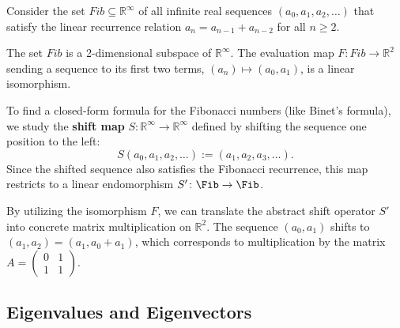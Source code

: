Consider the set $Fib \subseteq \mathbb{R}^\infty$ of all infinite real sequences $(a_0, a_1, a_2, \dots)$ that satisfy the linear recurrence relation $a_n = a_{n-1} + a_{n-2}$ for all $n \ge 2$.

\begin{proposition}
  The set $Fib$ is a 2-dimensional subspace of $\mathbb{R}^\infty$. The evaluation map $F \colon Fib \to \mathbb{R}^2$ sending a sequence to its first two terms, $(a_n) \mapsto (a_0, a_1)$, is a linear isomorphism.
\end{proposition}

To find a closed-form formula for the Fibonacci numbers (like Binet's formula), we study the \textbf{shift map} $S \colon \mathbb{R}^\infty \to \mathbb{R}^\infty$ defined by shifting the sequence one position to the left:
\[ S(a_0, a_1, a_2, \dots) := (a_1, a_2, a_3, \dots). \]
Since the shifted sequence also satisfies the Fibonacci recurrence, this map restricts to a linear endomorphism $S' \colon \Fib \to \Fib$.

By utilizing the isomorphism $F$, we can translate the abstract shift operator $S'$ into concrete matrix multiplication on $\mathbb{R}^2$. The sequence $(a_0, a_1)$ shifts to $(a_1, a_2) = (a_1, a_0 + a_1)$, which corresponds to multiplication by the matrix $A = \left(\begin{smallmatrix} 0 & 1 \\ 1 & 1 \end{smallmatrix}\right)$.

\begin{center}
\end{center}

\subsection{Eigenvalues and Eigenvectors}


